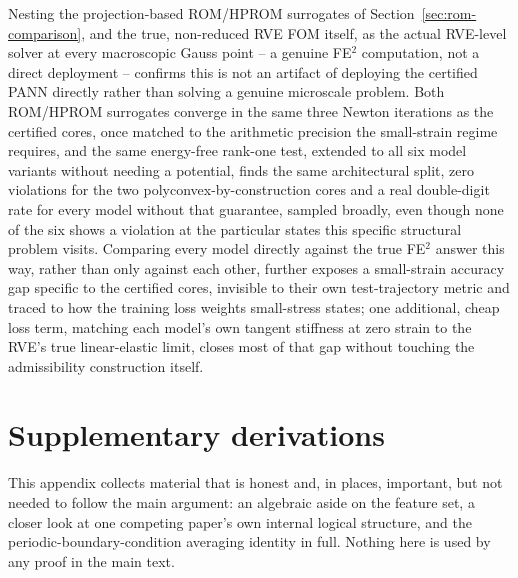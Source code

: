 \documentclass[10pt,a4paper]{article}
\begin{document}
Nesting the projection-based ROM/HPROM surrogates of
Section~\ref{sec:rom-comparison}, and the true, non-reduced RVE FOM
itself, as the actual RVE-level solver at every macroscopic Gauss point
-- a genuine FE$^2$ computation, not a direct deployment -- confirms this
is not an artifact of deploying the certified PANN directly rather than
solving a genuine microscale problem. Both ROM/HPROM surrogates converge
in the same three Newton iterations as the certified cores, once matched
to the arithmetic precision the small-strain regime requires, and the
same energy-free rank-one test, extended to all six model variants
without needing a potential, finds the same architectural split, zero
violations for the two polyconvex-by-construction cores and a real
double-digit rate for every model without that guarantee, sampled
broadly, even though none of the six shows a violation at the particular
states this specific structural problem visits. Comparing every model
directly against the true FE$^2$ answer this way, rather than only
against each other, further exposes a small-strain accuracy gap specific
to the certified cores, invisible to their own test-trajectory
metric and traced to how the training loss weights small-stress states;
one additional, cheap loss term, matching each model's own tangent
stiffness at zero strain to the RVE's true linear-elastic limit, closes
most of that gap without touching the admissibility construction itself.

\appendix
\section{Supplementary derivations}
\label{sec:appendix}
This appendix collects material that is honest and, in places,
important, but not needed to follow the main argument: an algebraic
aside on the feature set, a closer look at one competing paper's own
internal logical structure, and the periodic-boundary-condition
averaging identity in full. Nothing here is used by any proof in the
main text.
\end{document}
